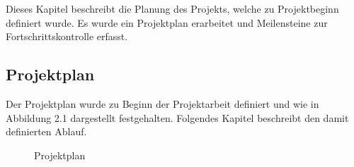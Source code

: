Dieses Kapitel beschreibt die Planung des Projekts, welche zu Projektbeginn definiert wurde.
Es wurde ein Projektplan erarbeitet und Meilensteine zur Fortschrittskontrolle erfasst.

\subsection{Projektplan}

Der Projektplan wurde zu Beginn der Projektarbeit definiert und wie in Abbildung 2.1 dargestellt festgehalten.
Folgendes Kapitel beschreibt den damit definierten Ablauf.

\begin{figure}[h]
    \centering
    \begin{minipage}[b]{\textwidth}
        \caption{Projektplan}
    \end{minipage}\label{fig:projektplan}
\end{figure}


